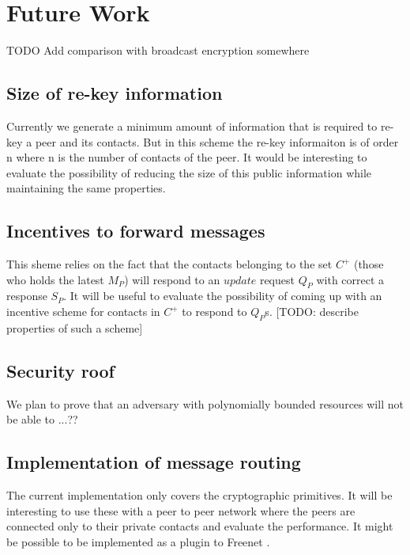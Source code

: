 \section{Future Work}

TODO Add comparison with broadcast encryption somewhere\\

\subsection{Size of re-key information}
Currently we generate a minimum amount of information that is required to re-key a peer and its contacts. But in this scheme the re-key informaiton is of order n where n is the number of contacts of the peer. It would be interesting to evaluate the possibility of reducing the size of this public information while maintaining the same properties.

\subsection{Incentives to forward messages}
This sheme relies on the fact that the contacts belonging to the set $C^+$ (those who holds the latest $M_P$) will respond to an $update$ request $Q_P$ with correct a response $S_P$. It will be useful to evaluate the possibility of coming up with an incentive scheme for contacts in $C^+$ to respond to $Q_P$s. [TODO: describe properties of such a scheme]

\subsection{Security roof}
We plan to prove that an adversary with polynomially bounded resources will not be able to ...??

\subsection{Implementation of message routing}
The current implementation only covers the cryptographic primitives. It will be interesting to use these with a peer to peer network where the peers are connected only to their private contacts and evaluate the performance. It might be possible to be implemented as a plugin to Freenet \cite{freenet}.


